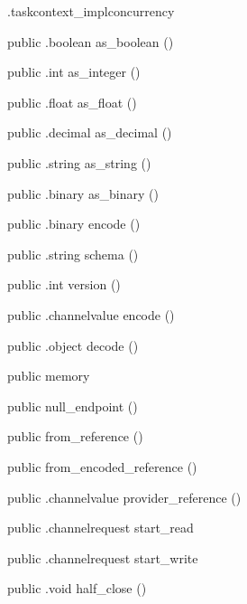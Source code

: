 \begin{CrexxClass}{.taskcontext\_impl}{concurrency}
\begin{Members}
    \Method
      {public}
      {.boolean}
      {as\_boolean}
      {()}

    \Method
      {public}
      {.int}
      {as\_integer}
      {()}

    \Method
      {public}
      {.float}
      {as\_float}
      {()}

    \Method
      {public}
      {.decimal}
      {as\_decimal}
      {()}

    \Method
      {public}
      {.string}
      {as\_string}
      {()}

    \Method
      {public}
      {.binary}
      {as\_binary}
      {()}

    \Method
      {public}
      {.binary}
      {encode}
      {()}

    \Method
      {public}
      {.string}
      {schema}
      {()}

    \Method
      {public}
      {.int}
      {version}
      {()}

    \Method
      {public}
      {.channelvalue}
      {encode}
      {()}

    \Method
      {public}
      {.object}
      {decode}
      {()}

    \Factory
      {public}
      {memory}
      {}

    \Factory
      {public}
      {null\_endpoint}
      {()}

    \Factory
      {public}
      {from\_reference}
      {()}

    \Factory
      {public}
      {from\_encoded\_reference}
      {()}

    \Method
      {public}
      {.channelvalue}
      {provider\_reference}
      {()}

    \Method
      {public}
      {.channelrequest}
      {start\_read}
      {}

    \Method
      {public}
      {.channelrequest}
      {start\_write}
      {}

    \Method
      {public}
      {.void}
      {half\_close}
      {()}


\end{Members}
\end{CrexxClass}
